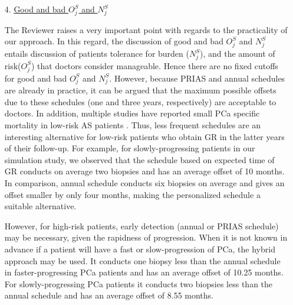\begin{enumerate}
 \item[4.] \underline{Good and bad $O^S_j$ and $N^S_j$}

 The Reviewer raises a very important point with regards to the practicality of our approach. In this regard, the discussion of good and bad $O^S_j$ and $N^S_j$ entails discussion of patients tolerance for burden ($N^S_j$), and the amount of risk($O^S_j$) that doctors consider manageable. Hence there are no fixed cutoffs for good and bad $O^S_j$ and $N^S_j$. However, because PRIAS and annual schedules are already in practice, it can be argued that the maximum possible offsets due to these schedules (one and three years, respectively) are acceptable to doctors. In addition, multiple studies have reported small PCa specific mortality in low-risk AS patients \citep{loeb2016immediate,tosoian2011active,klotz2009clinical}. Thus, less frequent schedules are an interesting alternative for low-risk patients who obtain GR in the latter years of their follow-up. For example, for slowly-progressing patients in our simulation study, we observed that the schedule based on expected time of GR conducts on average two biopsies and has an average offset of 10 months. In comparison, annual schedule conducts six biopsies on average and gives an offset smaller by only four months, making the personalized schedule a suitable alternative. 

However,  for high-risk patients, early detection (annual or PRIAS schedule) may be necessary, given the rapidness of progression. When it is not known in advance if a patient will have a fast or slow-progression of PCa, the hybrid approach may be used. It conducts one biopsy less than the annual schedule in faster-progressing PCa patients and has an average offset of 10.25 months. For slowly-progressing PCa patients it conducts two biopsies less than the annual schedule and has an average offset of 8.55 months.

\end{enumerate}

